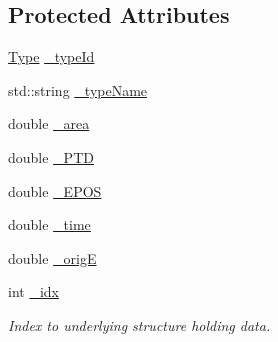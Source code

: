 \subsection*{Protected Attributes}
\begin{DoxyCompactItemize}
\item 
\hyperlink{classAnalysis_1_1FastJet_1_1CaloSignalInfo_ac03e8f6d7fb631eab49a9ab02cda7675}{Type} \hyperlink{classAnalysis_1_1FastJet_1_1CaloSignalInfo_ab46f3aed35f69718e0faa3b4aa4580a7}{\+\_\+type\+Id}
\item 
std\+::string \hyperlink{classAnalysis_1_1FastJet_1_1CaloSignalInfo_ad359585157bcda1da4b08560ce2d4977}{\+\_\+type\+Name}
\item 
double \hyperlink{classAnalysis_1_1FastJet_1_1CaloSignalInfo_aa6d9e317ef5ec7c3e75770e068552190}{\+\_\+area}
\item 
double \hyperlink{classAnalysis_1_1FastJet_1_1CaloSignalInfo_a4824760bad2a7b7683145a95e667a436}{\+\_\+\+P\+TD}
\item 
double \hyperlink{classAnalysis_1_1FastJet_1_1CaloSignalInfo_a332e388462beecce5426c3c3dfd43240}{\+\_\+\+E\+P\+OS}
\item 
double \hyperlink{classAnalysis_1_1FastJet_1_1CaloSignalInfo_ae6fd205bf7cf2490b9fb0f1878e0ae37}{\+\_\+time}
\item 
double \hyperlink{classAnalysis_1_1FastJet_1_1CaloSignalInfo_a55ae2c4227e431ea9f322461173628a6}{\+\_\+origE}
\item 
int \hyperlink{classAnalysis_1_1FastJet_1_1UserInfo_ad9aa33e317aea2b675493b664cc718a3}{\+\_\+idx}
\begin{DoxyCompactList}\small\item\em Index to underlying structure holding data. \end{DoxyCompactList}\end{DoxyCompactItemize}

